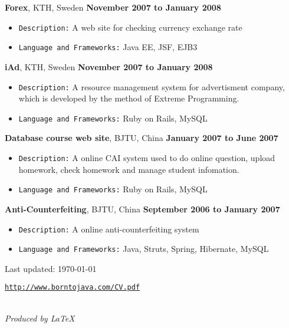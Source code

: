 \documentclass[11pt]{article}
\newenvironment{narrow}[2]{%
\begin{list}{}{%
\setlength{\topsep}{0pt}%
\setlength{\leftmargin}{#1}%
\setlength{\rightmargin}{#2}%
\setlength{\listparindent}{\parindent}%
\setlength{\itemindent}{\parindent}%
\setlength{\parsep}{\parskip}%
}%
\item[]}{\end{list}}
\newenvironment{outerlist}[1][\enskip\textbullet]%
        {\begin{itemize}[#1]}{\end{itemize}%
         \vspace{-.6\baselineskip}}
\newcommand{\blankline}{\quad\pagebreak[2]}
\begin{document}
\blankline

\textbf{Forex}, KTH, Sweden \hfill \textbf{November 2007 to January 2008}
\begin{outerlist}
\item \texttt{Description:}
A web site for checking currency exchange rate
\item \texttt{Language and Frameworks:}
Java EE, JSF, EJB3
\end{outerlist}

\blankline

\textbf{iAd}, KTH, Sweden \hfill \textbf{November 2007 to January 2008}
\begin{outerlist}
\item \texttt{Description:}
A resource management system for advertisment company, which is developed by the method of Extreme Programming.
\item \texttt{Language and Frameworks:}
Ruby on Rails, MySQL
\end{outerlist}

\blankline

\textbf{Database course web site}, BJTU, China \hfill \textbf{January 2007 to June 2007}
\begin{outerlist}
\item \texttt{Description:}
A online CAI system used to do online question, upload homework, check homework and manage student infomation.
\item \texttt{Language and Frameworks:}
Ruby on Rails, MySQL
\end{outerlist}

\blankline

\textbf{Anti-Counterfeiting}, BJTU, China \hfill \textbf{September 2006 to January 2007}
\begin{outerlist}
\item \texttt{Description:}
A online anti-counterfeiting system
\item \texttt{Language and Frameworks:}
Java, Struts, Spring, Hibernate, MySQL
\end{outerlist}



\vfill
\begin{narrow}{0.15in}{1.5in}
\begin{center}
\begin{footnotesize}
\begin{center}
Last updated: \today 
\end{center}
\href{http://www.borntojava.com/CV.pdf}{\tt http://www.borntojava.com/CV.pdf}
\end{footnotesize}\\
\vspace{0.2in}
\textit{Produced by \LaTeX}
\end{center}
\end{narrow}
\end{document}
